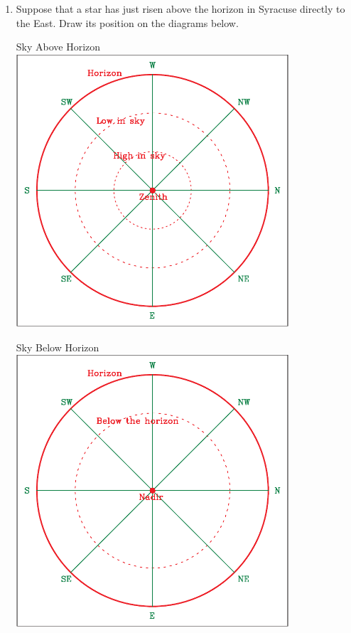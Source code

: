 \documentclass[12pt]{article}
\begin{document}
\begin{enumerate}
	
	\item Suppose that a star has just risen above the horizon in Syracuse directly to the East. Draw its position on the diagrams below.
	
	
	\begin{minipage}{0.5\textwidth}
		\begin{center}
			\large Sky Above Horizon\\
			\includegraphics[width=0.8\textwidth]{topsky-crop.pdf}
		\end{center}
	\end{minipage}
	\begin{minipage}{0.5\textwidth}
		\begin{center}
			\large Sky Below Horizon\\
			\includegraphics[width=0.8\textwidth]{botsky-crop.pdf}
		\end{center}
	\end{minipage}
	

\end{enumerate}
\end{document}
